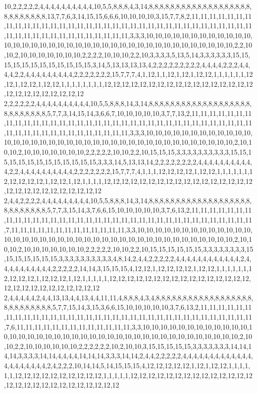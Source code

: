 10,2,2,2,2,2,4,4,4,4,4,4,4,4,4,4,10,5,5,8,8,8,4,3,14,8,8,8,8,8,8,8,8,8,8,8,8,8,8,8,8,8,8,8,8,8,8,8,8,8,8,8,13,7,7,6,3,14,15,15,6,6,6,10,10,10,10,3,15,7,7,8,2,11,11,11,11,11,11,11,11,11,11,11,11,11,11,11,11,11,11,11,11,11,11,11,11,11,11,11,11,11,11,11,11,11,11,11,11,11,11,11,11,11,11,11,11,11,11,11,11,11,3,3,3,10,10,10,10,10,10,10,10,10,10,10,10,10,10,10,10,10,10,10,10,10,10,10,10,10,10,10,10,10,10,10,10,10,10,10,10,10,10,2,2,10,10,2,10,10,10,10,10,10,10,2,2,2,2,10,10,10,2,2,10,3,3,3,3,5,13,5,14,3,3,3,3,3,3,15,15,15,15,15,15,15,15,15,15,15,15,3,14,5,13,13,13,13,4,2,2,2,2,2,2,2,2,2,4,4,4,4,2,2,2,4,4,4,4,2,2,4,4,4,4,4,4,4,4,4,2,2,2,2,2,2,2,15,7,7,7,4,1,12,1,1,12,1,12,1,12,12,1,1,1,1,1,1,12,12,1,12,12,1,12,12,1,1,1,1,1,1,1,1,12,12,12,12,12,12,12,12,12,12,12,12,12,12,12,12,12,12,12,12,12,12,12,12,12,12
2,2,2,2,2,2,4,4,4,4,4,4,4,4,4,4,10,5,5,8,8,8,14,3,14,8,8,8,8,8,8,8,8,8,8,8,8,8,8,8,8,8,8,8,8,8,8,8,8,8,8,8,5,7,7,3,14,15,14,3,6,6,7,10,10,10,10,10,3,7,7,13,2,11,11,11,11,11,11,11,11,11,11,11,11,11,11,11,11,11,11,11,11,11,11,11,11,11,11,11,11,11,11,11,11,11,11,11,11,11,11,11,11,11,11,11,11,11,11,11,11,11,3,3,3,10,10,10,10,10,10,10,10,10,10,10,10,10,10,10,10,10,10,10,10,10,10,10,10,10,10,10,10,10,10,10,10,10,10,10,10,10,10,2,10,10,10,2,10,10,10,10,10,10,10,2,2,2,2,2,10,10,2,2,10,15,15,15,3,3,3,3,3,3,3,3,3,3,15,15,15,15,15,15,15,15,15,15,15,15,15,3,3,3,14,5,13,13,14,2,2,2,2,2,2,2,2,4,4,4,4,4,4,4,4,4,4,4,2,2,4,4,4,4,4,4,4,4,4,4,2,2,2,2,2,2,2,15,7,7,7,4,1,1,1,12,12,12,12,1,12,12,1,1,1,1,1,1,12,12,12,12,12,1,12,12,1,12,1,1,1,1,12,12,12,12,12,12,12,12,12,12,12,12,12,12,12,12,12,12,12,12,12,12,12,12,12,12,12,12
2,4,4,2,2,2,2,4,4,4,4,4,4,4,4,4,10,5,5,8,8,8,14,3,14,8,8,8,8,8,8,8,8,8,8,8,8,8,8,8,8,8,8,8,8,8,8,8,8,8,8,8,5,7,7,3,15,14,3,7,6,6,15,10,10,10,10,10,3,7,6,13,2,11,11,11,11,11,11,11,11,11,11,11,11,11,11,11,11,11,11,11,11,11,11,11,11,11,11,11,11,11,11,11,11,11,11,11,7,11,11,11,11,11,11,11,11,11,11,11,11,11,3,3,10,10,10,10,10,10,10,10,10,10,10,10,10,10,10,10,10,10,10,10,10,10,10,10,10,10,10,10,10,10,10,10,10,10,10,10,10,10,10,2,10,10,10,2,10,10,10,10,10,10,10,2,2,2,2,2,10,10,2,2,10,15,15,15,15,15,15,3,3,3,3,3,3,3,3,15,15,15,15,15,15,15,3,3,3,3,3,3,3,3,3,3,4,8,14,2,4,4,2,2,2,2,2,4,4,4,4,4,4,4,4,4,4,4,4,2,4,4,4,4,4,4,4,4,4,4,2,2,2,2,2,14,14,3,15,15,15,4,12,12,1,12,12,12,12,1,12,12,1,1,1,1,1,1,12,12,12,12,1,12,12,12,1,12,1,1,1,1,1,12,12,12,12,12,12,12,12,12,12,12,12,12,12,12,12,12,12,12,12,12,12,12,12,12,12,12
2,4,4,4,4,4,2,4,4,13,13,4,4,13,4,4,11,11,4,8,8,8,4,3,4,8,8,8,8,8,8,8,8,8,8,8,8,8,8,8,8,8,8,8,8,8,8,8,8,8,8,8,5,7,7,15,14,3,15,3,6,6,15,10,10,10,10,10,3,7,6,13,2,11,11,11,11,11,11,11,11,11,11,11,11,11,11,11,11,11,11,11,11,11,11,11,11,11,11,11,11,11,11,11,11,11,11,7,6,11,11,11,11,11,11,11,11,11,11,11,11,11,3,3,10,10,10,10,10,10,10,10,10,10,10,10,10,10,10,10,10,10,10,10,10,10,10,10,10,10,10,10,10,10,10,10,10,10,10,10,10,10,10,2,10,10,2,2,10,10,10,10,10,10,2,2,2,2,2,2,10,2,10,10,3,15,15,15,15,15,3,3,3,3,3,3,3,14,14,14,14,3,3,3,3,14,14,4,4,4,4,14,14,14,3,3,3,14,14,2,4,4,2,2,2,2,2,4,4,4,4,4,4,4,4,4,4,4,4,4,4,4,4,4,4,4,4,4,2,4,2,2,2,10,14,14,5,14,15,15,15,4,12,12,12,12,12,1,12,1,12,12,1,1,1,1,1,1,12,12,12,12,12,12,12,12,12,12,1,1,1,1,1,12,12,12,12,12,12,12,12,12,12,12,12,12,12,12,12,12,12,12,12,12,12,12,12,12,12,12
